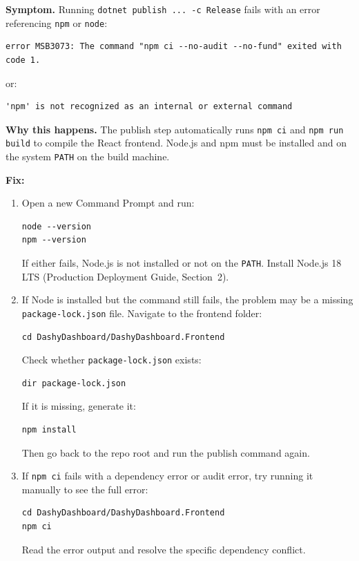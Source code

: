 \documentclass[a4paper,11pt]{article}
\begin{document}
\textbf{Symptom.}
Running
\texttt{dotnet publish ... -c Release}
fails with an error referencing \texttt{npm} or \texttt{node}:

\begin{lstlisting}
error MSB3073: The command "npm ci --no-audit --no-fund" exited with code 1.
\end{lstlisting}
or:
\begin{lstlisting}
'npm' is not recognized as an internal or external command
\end{lstlisting}

\textbf{Why this happens.}
The publish step automatically runs \texttt{npm ci} and \texttt{npm run build}
to compile the React frontend.
Node.js and npm must be installed and on the system \texttt{PATH} on the build machine.

\textbf{Fix:}

\begin{enumerate}
  \item Open a new Command Prompt and run:
\begin{lstlisting}
node --version
npm --version
\end{lstlisting}
        If either fails, Node.js is not installed or not on the \texttt{PATH}.
        Install Node.js 18 LTS (Production Deployment Guide, Section~2).
  \item If Node is installed but the command still fails,
        the problem may be a missing \texttt{package-lock.json} file.
        Navigate to the frontend folder:
\begin{lstlisting}
cd DashyDashboard/DashyDashboard.Frontend
\end{lstlisting}
        Check whether \texttt{package-lock.json} exists:
\begin{lstlisting}
dir package-lock.json
\end{lstlisting}
        If it is missing, generate it:
\begin{lstlisting}
npm install
\end{lstlisting}
        Then go back to the repo root and run the publish command again.
  \item If \texttt{npm ci} fails with a dependency error or audit error,
        try running it manually to see the full error:
\begin{lstlisting}
cd DashyDashboard/DashyDashboard.Frontend
npm ci
\end{lstlisting}
        Read the error output and resolve the specific dependency conflict.
\end{enumerate}
\end{document}
